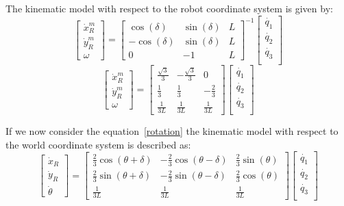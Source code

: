 The kinematic model with respect to the robot coordinate system is given by:
\begin{equation}
\begin{bmatrix}
\dot{x}^m _R\\
\dot{y}^m _R\\
{\omega}
\end{bmatrix} =
\begin{bmatrix}
\cos(\delta) & \sin(\delta) & L\\
-\cos(\delta) & \sin(\delta) & L\\
0 & -1 & L
\end{bmatrix}^{-1}
\begin{bmatrix}
\dot{q_1}\\
\dot{q_2}\\
\dot{q_3}\\
\end{bmatrix}	
\label{model1}
\end{equation}
\begin{equation*}
	\begin{bmatrix}
		\dot{x}^m _R\\
		\dot{y}^m _R\\
		{\omega}
	\end{bmatrix} =
	\begin{bmatrix}
		\frac{\sqrt{3}}{3} & -\frac{\sqrt{3}}{3} & 0\\
		\frac{1}{3} & \frac{1}{3} & -\frac{2}{3}\\
		\frac{1}{3L} & \frac{1}{3L} & \frac{1}{3L}
	\end{bmatrix}
	\begin{bmatrix}
		\dot{q_1}\\
		\dot{q_2}\\
		\dot{q_3}\\
	\end{bmatrix}	
\end{equation*}

If we now consider the equation~\ref{rotation} the kinematic model with respect to the world coordinate system is described as:
\begin{equation}
\begin{bmatrix}
\dot{x}_R\\
\dot{y}_R\\
\dot{\theta}
\end{bmatrix} =
\begin{bmatrix}
\frac{2}{3}\cos(\theta+\delta) & -\frac{2}{3}\cos(\theta-\delta) & \frac{2}{3}\sin(\theta)\\
\frac{2}{3}\sin(\theta+\delta) & -\frac{2}{3}\sin(\theta-\delta) & \frac{2}{3}\cos(\theta)\\
\frac{1}{3L} & \frac{1}{3L} & \frac{1}{3L}
\end{bmatrix}
\begin{bmatrix}
\dot{q_1}\\
\dot{q_2}\\
\dot{q_3}\\
\end{bmatrix}	
\label{model2}
\end{equation}

